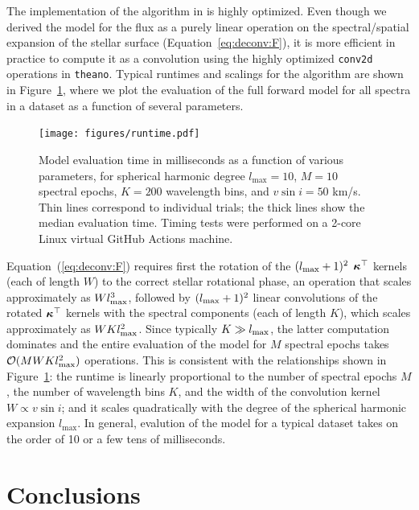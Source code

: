 \documentclass[modern]{aastex631}
\begin{document}
The implementation of the algorithm in \starry is highly optimized.
Even though we derived the model for the flux as a purely linear operation on the spectral/spatial expansion of the stellar surface (Equation~\ref{eq:deconv:F}), it is more  efficient in practice to compute it as a convolution using the highly optimized \texttt{conv2d} operations in \texttt{theano}.
Typical runtimes and scalings for the \starry algorithm are shown in Figure~\ref{fig:runtime}, where we plot the evaluation of the full forward model for all spectra in a dataset as a function of several parameters.
%
\begin{figure}[t!]
    \begin{centering}
        \texttt{[image: figures/runtime.pdf]}
        \caption{%
            Model evaluation time in milliseconds as a function of various parameters, for spherical harmonic degree $l_\mathrm{max} = 10$, $M = 10$ spectral epochs, $K = 200$ wavelength bins, and $v\sin i = 50$ km/s.
            Thin lines correspond to individual trials; the thick lines show the median evaluation time.
            Timing tests were performed on a 2-core Linux virtual GitHub Actions machine.
        }
        \label{fig:runtime}
    \end{centering}
\end{figure}
%
Equation~(\ref{eq:deconv:F}) requires first the rotation of the $(l_\mathrm{max} + 1)^2$ $\boldsymbol{\kappa}^\top$ kernels (each of length $W$) to the correct stellar rotational phase, an operation that scales approximately as $W l_\mathrm{max}^3$, followed by $(l_\mathrm{max} + 1)^2$ linear convolutions of the rotated $\boldsymbol{\kappa}^\top$ kernels with the spectral components (each of length $K$), which scales approximately as $W K l_\mathrm{max}^2$. 
Since typically $K \gg l_\mathrm{max}$, the latter computation dominates and the entire evaluation of the model for $M$ spectral epochs takes $\mathcal{O}(M W K l_\mathrm{max}^2)$ operations. 
This is consistent with the relationships shown in Figure~\ref{fig:runtime}: the runtime is linearly proportional to the number of spectral epochs $M$, the number of wavelength bins $K$, and the width of the convolution kernel $W \propto v\sin i$; and it scales quadratically with the degree of the spherical harmonic expansion $l_\mathrm{max}$.
In general, evalution of the model for a typical dataset takes on the order of 10 or a few tens of milliseconds.



\section{Conclusions}
\label{sec:conclusions}
%
\end{document}
